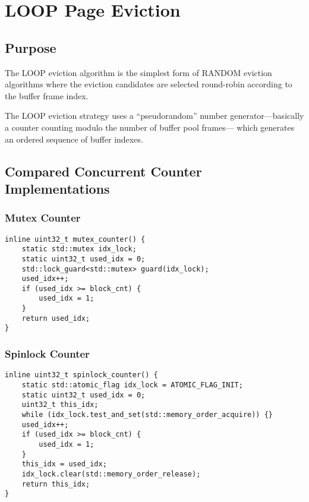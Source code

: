 \chapter[LOOP Page Eviction]{LOOP Page Eviction} \label{ch:loop}

\section[Purpose]{Purpose}

    The LOOP eviction algorithm is the simplest form of RANDOM eviction algorithms where the eviction candidates are selected round-robin according to the buffer frame index.

    The LOOP eviction strategy uses a ``pseudorandom'' number generator---basically a counter counting modulo the number of buffer pool frames--- which generates an ordered sequence of buffer indexes.

\section[Compared Concurrent Counter Implementations]{Compared Concurrent Counter Implementations}

    

\subsection[Mutex Counter]{Mutex Counter} \label{subsec:mutex_counter}

\begin{@empty}
    \lstset{
        language = [ISO]C++,
        style = basic
    }
    \begin{lstlisting}
inline uint32_t mutex_counter() {
    static std::mutex idx_lock;
    static uint32_t used_idx = 0;
    std::lock_guard<std::mutex> guard(idx_lock);
    used_idx++;
    if (used_idx >= block_cnt) {
        used_idx = 1;
    }
    return used_idx;
}
    \end{lstlisting}
\end{@empty}

\subsection[Spinlock Counter]{Spinlock Counter} \label{subsec:spinlock_counter}

\begin{@empty}
    \lstset{
        language = [ISO]C++,
        style = basic
    }
    \begin{lstlisting}
inline uint32_t spinlock_counter() {
    static std::atomic_flag idx_lock = ATOMIC_FLAG_INIT;
    static uint32_t used_idx = 0;
    uint32_t this_idx;
    while (idx_lock.test_and_set(std::memory_order_acquire)) {}
    used_idx++;
    if (used_idx >= block_cnt) {
        used_idx = 1;
    }
    this_idx = used_idx;
    idx_lock.clear(std::memory_order_release);
    return this_idx;
}
    \end{lstlisting}
\end{@empty}

